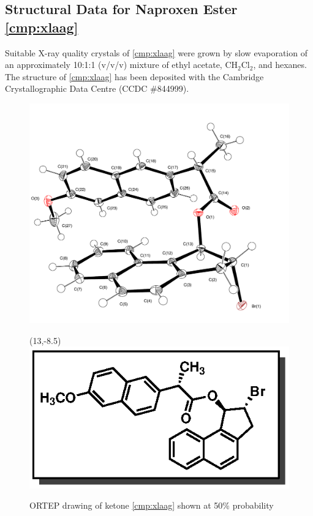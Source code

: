\subsection{Structural Data for Naproxen Ester \ref{cmp:xlaag}}
Suitable X-ray quality crystals of \ref{cmp:xlaag} were grown by slow
evaporation of an approximately 10:1:1 (v/v/v) mixture of ethyl acetate, CH$_2$Cl$_2$, and
hexanes. The structure of \ref{cmp:xlaag} has been deposited with the Cambridge Crystallographic
Data Centre (CCDC \#844999).
\vspace{10pt}
\begin{figure}[h]
  \includegraphics[width=4.5in]{chp_asymmetric/images/xray/xlaag_labelled}
    \begin{textblock}{1}(13,-8.5)
\includegraphics[scale=0.8]{chp_asymmetric/images/xlaag}
\end{textblock}
  \caption{ORTEP drawing of ketone \ref{cmp:xlaag} shown at 50\% probability }
\end{figure}
